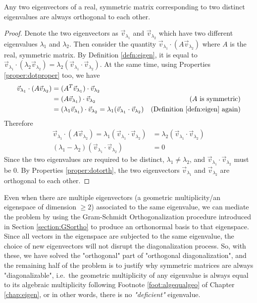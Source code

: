 \begin{proper}
\label{proper:symortho}
Any two eigenvectors of a real, symmetric matrix corresponding to two distinct eigenvalues are always orthogonal to each other.
\end{proper}
\begin{proof}
Denote the two eigenvectors as $\vec{v}_{\lambda_1}$ and $\vec{v}_{\lambda_2}$ which have two different eigenvalues $\lambda_1$ and $\lambda_2$. Then consider the quantity $\vec{v}_{\lambda_1} \cdot (A\vec{v}_{\lambda_2})$ where $A$ is the real, symmetric matrix. By Definition \ref{defn:eigen}, it is equal to $\vec{v}_{\lambda_1} \cdot (\lambda_{2}\vec{v}_{\lambda_2}) = \lambda_{2}(\vec{v}_{\lambda_1} \cdot \vec{v}_{\lambda_2})$. At the same time, using Properties \ref{proper:dotproper} too, we have
\begin{align*}
\vec{v}_{\lambda_1}\cdot (A\vec{v}_{\lambda_2}) &=    (A^T\vec{v}_{\lambda_1})\cdot \vec{v}_{\lambda_2} \\
&= (A\vec{v}_{\lambda_1})\cdot \vec{v}_{\lambda_2} &\text{($A$ is symmetric)} \\
&= (\lambda_1\vec{v}_{\lambda_1})\cdot \vec{v}_{\lambda_2} = \lambda_1(\vec{v}_{\lambda_1}\cdot \vec{v}_{\lambda_2}) &\text{(Definition \ref{defn:eigen} again)}
\end{align*}
Therefore
\begin{align*}
\vec{v}_{\lambda_1}\cdot (A\vec{v}_{\lambda_2}) =  \lambda_1(\vec{v}_{\lambda_1}\cdot \vec{v}_{\lambda_2}) &= \lambda_{2}(\vec{v}_{\lambda_1}\cdot \vec{v}_{\lambda_2}) \\
(\lambda_{1}-\lambda_{2})(\vec{v}_{\lambda_1}\cdot \vec{v}_{\lambda_2}) &= 0
\end{align*}
Since the two eigenvalues are required to be distinct, $\lambda_{1} \neq \lambda_{2}$, and $\vec{v}_{\lambda_1}\cdot \vec{v}_{\lambda_2}$ must be $0$. By Properties \ref{proper:dotorth}, the two eigenvectors $\vec{v}_{\lambda_1}$ and $\vec{v}_{\lambda_2}$ are orthogonal to each other.
\end{proof}
Even when there are multiple eigenvectors (a geometric multiplicity/an eigenspace of dimension $\geq 2$) associated to the same eigenvalue, we can mediate the problem by using the Gram-Schmidt Orthogonalization procedure introduced in Section \ref{section:GSortho} to produce an orthonormal basis to that eigenspace. Since all vectors in the eigenspace are subjected to the same eigenvalue, the choice of new eigenvectors will not disrupt the diagonalization process. So, with these, we have solved the "orthogonal" part of "orthogonal diagonalization", and the remaining half of the problem is to justify why symmetric matrices are always "diagonalizable", i.e.\ the geometric multiplicity of any eigenvalue is always equal to its algebraic multiplicity following Footnote \ref{foot:algequalgeo} of Chapter \ref{chap:eigen}, or in other words, there is no \textit{"deficient"} eigenvalue.
